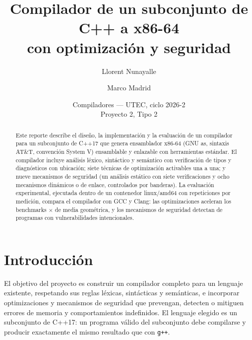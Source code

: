 \documentclass[11pt,a4paper]{article}
\title{Compilador de un subconjunto de C++ a x86-64\\con optimización y seguridad}
\author{Llorent Nunayalle \and Marco Madrid}
\date{Compiladores --- UTEC, ciclo 2026-2\\Proyecto 2, Tipo 2}
\newcommand{\cod}[1]{\texttt{#1}}
\begin{document}
\maketitle

\begin{abstract}
Este reporte describe el diseño, la implementación y la evaluación de un compilador para un subconjunto de C++17
que genera ensamblador x86-64 (GNU as, sintaxis AT\&T, convención System V) ensamblable y enlazable con
herramientas estándar. El compilador incluye análisis léxico, sintáctico y semántico con verificación de tipos y
diagnósticos con ubicación; siete técnicas de optimización activables una a una; y nueve mecanismos de seguridad
(un análisis estático con siete verificaciones y ocho mecanismos dinámicos o de enlace, controlados por banderas). La evaluación experimental, ejecutada
dentro de un contenedor linux/amd64 con \runsPorMedicion{} repeticiones por medición, compara el compilador
con GCC y Clang: las optimizaciones aceleran los benchmarks \aceleracionMedia$\times$ de media geométrica, y los
mecanismos de seguridad detectan \vulnPropio{} de \vulnTotal{} programas con vulnerabilidades intencionales.
\end{abstract}

\tableofcontents
\newpage

\section{Introducción}
\label{sec:intro}
El objetivo del proyecto es construir un compilador completo para un lenguaje existente, respetando sus reglas
léxicas, sintácticas y semánticas, e incorporar optimizaciones y mecanismos de seguridad que prevengan, detecten
o mitiguen errores de memoria y comportamientos indefinidos. El lenguaje elegido es un subconjunto de C++17: un
programa válido del subconjunto debe compilarse y producir exactamente el mismo resultado que con \cod{g++}.
\end{document}
